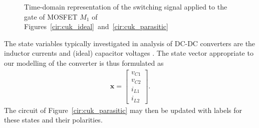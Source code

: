 \begin{figure}[H]
\centering
{}
\caption{Time-domain representation of the switching signal applied to the gate of MOSFET $M_1$ of Figures~\ref{cir:cuk_ideal}~and~\ref{cir:cuk_parasitic}}
\label{fig:switching}
\end{figure}
The state variables typically investigated in analysis of DC-DC converters are the inductor currents and (ideal) capacitor voltages \cite{cuk}. The state vector appropriate to our modelling of the converter is thus formulated as
\begin{align}
    \boldsymbol{x}
    =
	\begin{bmatrix}
		v_{C1} \\ v_{C2} \\ i_{L1} \\ i_{L2}
	\end{bmatrix}.
	\label{eqn:statevector_1}
\end{align}
The circuit of Figure~\ref{cir:cuk_parasitic} may then be updated with labels for these states and their polarities.
